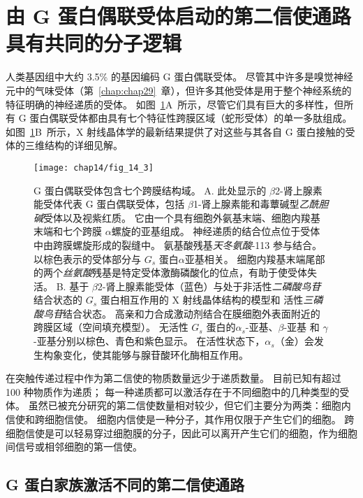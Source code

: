 \section{由 G 蛋白偶联受体启动的第二信使通路具有共同的分子逻辑}

人类基因组中大约 3.5\% 的基因编码 G 蛋白偶联受体。
尽管其中许多是嗅觉神经元中的气味受体（第~\ref{chap:chap29}~章），但许多其他受体是用于整个神经系统的特征明确的神经递质的受体。
如图~\ref{fig:14_3}A~所示，尽管它们具有巨大的多样性，但所有 G 蛋白偶联受体都由具有七个特征性跨膜区域（蛇形受体）的单一多肽组成。
如图~\ref{fig:14_3}B~所示，X 射线晶体学的最新结果提供了对这些与其各自 G 蛋白接触的受体的三维结构的详细见解。


\begin{figure}[htbp]
	\centering
	\texttt{[image: chap14/fig\_14\_3]}
	\caption{G 蛋白偶联受体包含七个跨膜结构域。
		A. 此处显示的 $\beta$2-肾上腺素能受体代表 G 蛋白偶联受体，包括 $\beta$1-肾上腺素能和毒蕈碱型\textit{乙酰胆碱}受体以及视紫红质。
		它由一个具有细胞外氨基末端、细胞内羧基末端和七个跨膜 $\alpha$螺旋的亚基组成。
		神经递质的结合位点位于受体中由跨膜螺旋形成的裂缝中。
		氨基酸残基\textit{天冬氨酸}-113 参与结合。
		以棕色表示的受体部分与 $ G_s $ 蛋白$\alpha$亚基相关。
		细胞内羧基末端尾部的两个\textit{丝氨酸}残基是特定受体激酶磷酸化的位点，有助于使受体失活\cite{frielle1989beta}。
		B. 基于 $\beta$2-肾上腺素能受体（蓝色）与处于非活性\textit{二磷酸鸟苷}结合状态的 $ G_s $ 蛋白相互作用的 X 射线晶体结构的模型和 活性\textit{三磷酸鸟苷}结合状态。
		高亲和力合成激动剂结合在膜细胞外表面附近的跨膜区域（空间填充模型）。
		无活性 $ G_s $ 蛋白的$\alpha_s$-亚基、$\beta$-亚基 和 $\gamma$-亚基分别以棕色、青色和紫色显示。
		在活性状态下，$\alpha_s$（金）会发生构象变化，使其能够与腺苷酸环化酶相互作用\cite{kobilka2013structural}。}
	\label{fig:14_3}
\end{figure}


在突触传递过程中作为第二信使的物质数量远少于递质数量。
目前已知有超过 100 种物质作为递质；
每一种递质都可以激活存在于不同细胞中的几种类型的受体。
虽然已被充分研究的第二信使数量相对较少，但它们主要分为两类：细胞内信使和跨细胞信使。
细胞内信使是一种分子，其作用仅限于产生它们的细胞。
跨细胞信使是可以轻易穿过细胞膜的分子，因此可以离开产生它们的细胞，作为细胞间信号或相邻细胞的第一信使。


\subsection{G 蛋白家族激活不同的第二信使通路}

